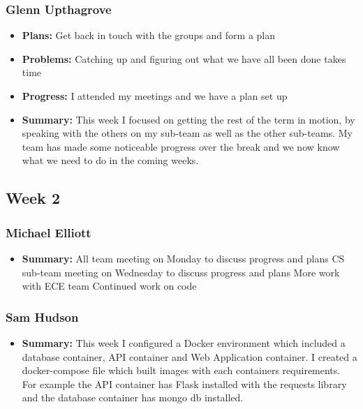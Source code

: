 \documentclass[onecolumn, draftclsnofoot,10pt, compsoc]{IEEEtran}
\begin{document}
\subsubsection{Glenn Upthagrove}
\begin {itemize}
 \item \textbf{Plans: }Get back in touch with the groups and form a plan  
 \item \textbf{Problems: }Catching up and figuring out what we have all been done takes time 
 \item \textbf{Progress: }I attended my meetings and we have a plan set up 
 \item \textbf{Summary: }This week I focused on getting the rest of the term in motion, by speaking with the others on my sub-team as well as the other sub-teams. My team has made some noticeable progress over the break and we now know what we need to do in the coming weeks.  
\end {itemize}
\subsection {Week 2}
\subsubsection{Michael Elliott}
\begin {itemize}
\item \textbf{Summary: }
All team meeting on Monday to discuss progress and plans
CS sub-team meeting on Wednesday to discuss progress and plans
More work with ECE team
Continued work on code
\end {itemize}
\subsubsection{Sam Hudson}
\begin {itemize}
\item \textbf{Summary: }This week I configured a Docker environment which included a database container, API container and Web Application container. I created a docker-compose file which built images with each containers requirements. For example the API container has Flask installed with the requests library and the database container has mongo db installed.
\end {itemize}
\end{document}
